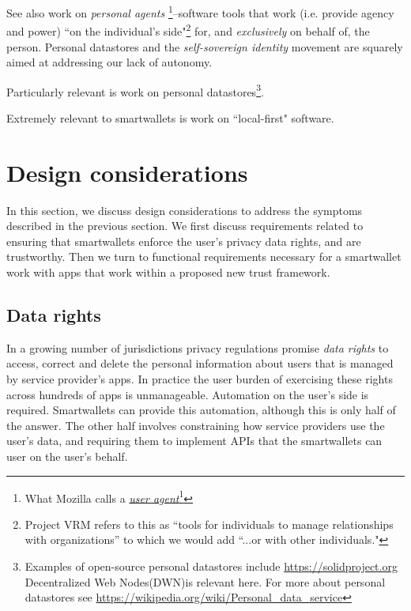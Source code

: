 \documentclass[11pt, oneside]{article}   	%
\newcommand{\hyperfootnote}[1][]{\def\ArgI{{#1}}\hyperfootnoteRelay}
\newcommand\hyperfootnoteRelay[2][]{\href{#1#2}{\ArgI}\footnote{\href{#1#2}{#2}}}
\begin{document}
See also work on \emph{personal agents} \footnote{What Mozilla calls a \hyperfootnote[\emph{user agent}][https://]{developer.mozilla.org/en-US/docs/Glossary/User\_agent}}--software tools that work (i.e. provide agency and power) ``on the individual's side"\footnote{Project VRM\cite{Searls2019} refers to this as ``tools for individuals to manage relationships with organizations'' to which we would add ``...or with other individuals."} for, and \emph{exclusively} on behalf of, the person. Personal datastores and the \emph{self-sovereign identity}\cite{Preukschat2021} movement are squarely aimed at addressing our lack of autonomy.

Particularly relevant is work on personal datastores\footnote{Examples of open-source personal datastores include \url{https://solidproject.org} Decentralized Web Nodes(DWN)is relevant here. For more about personal datastores see \url{https://wikipedia.org/wiki/Personal\_data\_service}}. 

Extremely relevant to smartwallets is work on ``local-first" software.\cite{Kleppmann2019}

\section{Design considerations} %

In this section, we discuss design considerations to address the symptoms described in the previous section. We first discuss requirements related to ensuring that smartwallets enforce the user's privacy data rights, and are trustworthy. Then we turn to functional requirements necessary for a smartwallet work with apps that work within a proposed new trust framework.

\subsection{Data rights}

In a growing number of jurisdictions privacy regulations promise \emph{data rights} to access, correct and delete the personal information about users that is managed by service provider's apps. In practice the user burden of exercising these rights across hundreds of apps is unmanageable. Automation on the user's side is required. Smartwallets can provide this automation, although this is only half of the answer. The other half involves constraining how service providers use the user's data, and requiring them to implement APIs that the smartwallets can user on the user's behalf. 
\end{document}

